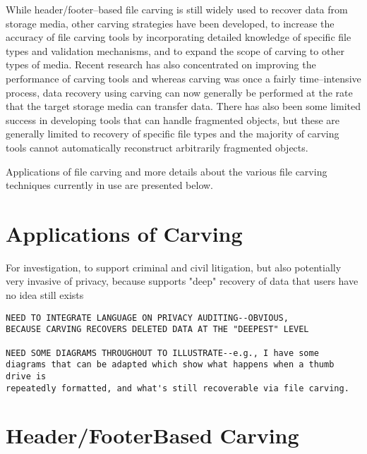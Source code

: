 While header/footer--based file carving is still widely used to recover data from storage media, other carving strategies have been developed, to increase the accuracy of file carving tools by incorporating detailed knowledge of specific file types and validation mechanisms, and to expand the scope of carving to other types of media.  Recent research has also concentrated on improving the performance of carving tools and whereas carving was once a fairly time--intensive process, data recovery using carving can now generally be performed at the rate that the target storage media can transfer data.  There has also been some limited success in developing tools that can handle fragmented objects, but these are generally limited to recovery of specific file types and the majority of carving tools cannot automatically reconstruct arbitrarily fragmented objects.   

Applications of file carving and more details about the various file carving techniques currently in use are presented below.

\section{Applications of Carving}

For investigation, to support criminal and civil litigation, but also potentially very invasive of privacy, because supports "deep" recovery of data that users have no idea still exists

\begin{Verbatim}
NEED TO INTEGRATE LANGUAGE ON PRIVACY AUDITING--OBVIOUS, 
BECAUSE CARVING RECOVERS DELETED DATA AT THE "DEEPEST" LEVEL

NEED SOME DIAGRAMS THROUGHOUT TO ILLUSTRATE--e.g., I have some 
diagrams that can be adapted which show what happens when a thumb drive is
repeatedly formatted, and what's still recoverable via file carving.
\end{Verbatim}

\section{Header/Footer\-Based Carving}

